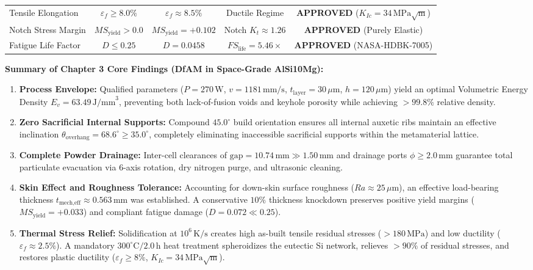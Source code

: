 \begin{table}[htbp]
\begin{adjustbox}{max width=\textwidth}
\begin{tabular}{lcccc}
Tensile Elongation & $\varepsilon_f \ge 8.0\%$ & $\varepsilon_f \approx 8.5\%$ & Ductile Regime & \textbf{APPROVED} ($K_{Ic} = 34\,\text{MPa}\sqrt{\text{m}}$) \\
Notch Stress Margin & $MS_{\text{yield}} > 0.0$ & $MS_{\text{yield}} = +0.102$ & Notch $K_t \approx 1.26$ & \textbf{APPROVED} (Purely Elastic) \\
Fatigue Life Factor & $D \le 0.25$ & $D = 0.0458$ & $FS_{\text{life}} = 5.46\times$ & \textbf{APPROVED} (NASA-HDBK-7005) \\
\bottomrule
\end{tabular}
\end{adjustbox}
\end{table}

\begin{svgraybox}
\textbf{Summary of Chapter 3 Core Findings (DfAM in Space-Grade AlSi10Mg):}
\begin{enumerate}
\item \textbf{Process Envelope:} Qualified parameters ($P = 270\,\text{W}$, $v = 1181\,\text{mm/s}$, $t_{\text{layer}} = 30\,\mu\text{m}$, $h = 120\,\mu\text{m}$) yield an optimal Volumetric Energy Density $E_v = 63.49\,\text{J/mm}^3$, preventing both lack-of-fusion voids and keyhole porosity while achieving $>99.8\%$ relative density.
\item \textbf{Zero Sacrificial Internal Supports:} Compound $45.0^\circ$ build orientation ensures all internal auxetic ribs maintain an effective inclination $\theta_{\text{overhang}} = 68.6^\circ \ge 35.0^\circ$, completely eliminating inaccessible sacrificial supports within the metamaterial lattice.
\item \textbf{Complete Powder Drainage:} Inter-cell clearances of $\text{gap} = 10.74\,\text{mm} \gg 1.50\,\text{mm}$ and drainage ports $\phi \ge 2.0\,\text{mm}$ guarantee total particulate evacuation via 6-axis rotation, dry nitrogen purge, and ultrasonic cleaning.
\item \textbf{Skin Effect and Roughness Tolerance:} Accounting for down-skin surface roughness ($Ra \approx 25\,\mu\text{m}$), an effective load-bearing thickness $t_{\text{mech,eff}} \approx 0.563\,\text{mm}$ was established. A conservative $10\%$ thickness knockdown preserves positive yield margins ($MS_{\text{yield}} = +0.033$) and compliant fatigue damage ($D = 0.072 \ll 0.25$).
\item \textbf{Thermal Stress Relief:} Solidification at $10^6\,\text{K/s}$ creates high as-built tensile residual stresses ($> 180\,\text{MPa}$) and low ductility ($\varepsilon_f \approx 2.5\%$). A mandatory $300^\circ\text{C} / 2.0\,\text{h}$ heat treatment spheroidizes the eutectic Si network, relieves $>90\%$ of residual stresses, and restores plastic ductility ($\varepsilon_f \ge 8\%$, $K_{Ic} = 34\,\text{MPa}\sqrt{\text{m}}$).

\end{enumerate}
\end{svgraybox}
